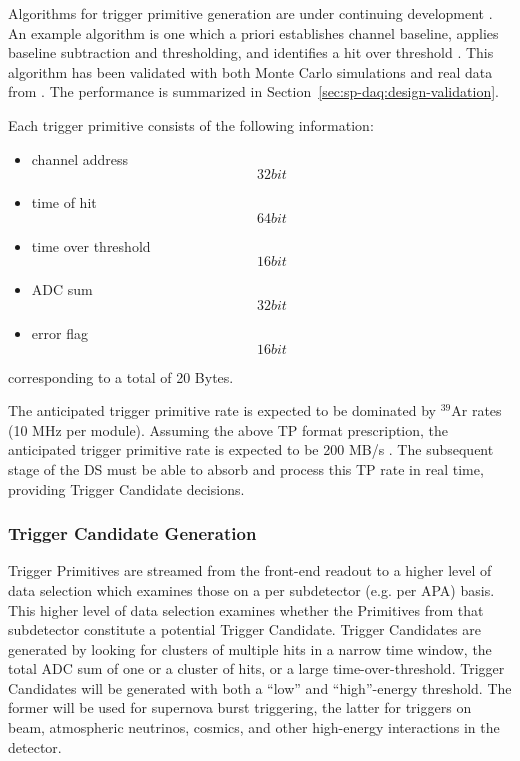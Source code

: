 Algorithms for trigger primitive generation are under continuing development
\cite{docid-11275}. An example algorithm is one which a priori establishes
channel baseline, applies baseline subtraction and thresholding, and
identifies a hit over threshold \cite{docid-11236}. This algorithm has been
validated with both Monte Carlo simulations and real data from . The performance is
summarized in Section~\ref{sec:sp-daq:design-validation}.

Each trigger primitive consists of the following information:
\begin{itemize}
\item channel address \[32 bit\]
\item time of hit \[64 bit\]
\item time over threshold \[16 bit\]
\item ADC sum \[32 bit\]
\item error flag \[16 bit\]
\end{itemize}
corresponding to a total of 20 Bytes.

The anticipated trigger primitive rate  is expected to be dominated by
$^{39}$Ar rates (10 MHz per module). Assuming the above TP format
prescription, the anticipated trigger primitive rate is expected to be
200 MB/s . The subsequent stage of the DS must be able to absorb and
process this TP rate in real time, providing Trigger Candidate decisions. 


\subsubsection{Trigger Candidate Generation}

Trigger Primitives are streamed from the front-end  readout to a
higher level of data selection which examines those on a per
subdetector (e.g. per APA) basis. This higher level of data selection examines
whether the Primitives from that subdetector constitute a potential
Trigger Candidate. Trigger Candidates are generated by looking for
clusters of multiple hits in a narrow time window, the total ADC sum of one or a
cluster of hits, or a large time-over-threshold. Trigger 
Candidates will be generated with both a “low” and “high”-energy threshold. The former
will be used for supernova burst triggering, the latter for triggers on beam, atmospheric
neutrinos, cosmics, and other high-energy interactions in the detector. 

